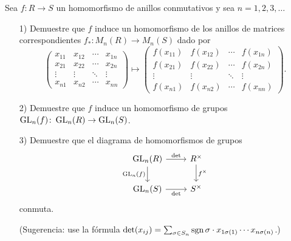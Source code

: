 \begin{ejercicio}
  Sea $f\colon R\to S$ un homomorfismo de anillos conmutativos y sea
  $n = 1,2,3,\ldots$

  \begin{enumerate}
  \item[1)] Demuestre que $f$ induce un homomorfismo de los anillos de matrices
    correspondientes $f_*\colon M_n (R) \to M_n (S)$ dado por
    \[ \begin{pmatrix}
        x_{11} & x_{12} & \cdots & x_{1n} \\
        x_{21} & x_{22} & \cdots & x_{2n} \\
        \vdots & \vdots & \ddots & \vdots \\
        x_{n1} & x_{n2} & \cdots & x_{nn}
      \end{pmatrix}
      \mapsto
      \begin{pmatrix}
        f (x_{11}) & f (x_{12}) & \cdots & f (x_{1n}) \\
        f (x_{21}) & f (x_{22}) & \cdots & f (x_{2n}) \\
        \vdots & \vdots & \ddots & \vdots \\
        f (x_{n1}) & f (x_{n2}) & \cdots & f (x_{nn})
      \end{pmatrix}. \]

  \item[2)] Demuestre que $f$ induce un homomorfismo de grupos
    $\operatorname{GL}_n (f)\colon \operatorname{GL}_n (R) \to \operatorname{GL}_n (S)$.

  \item[3)] Demuestre que el diagrama de homomorfismos de grupos
    \[ \begin{tikzcd}
        \GL_n (R) \ar{r}{\det}\ar{d}[swap]{\GL_n (f)} &
        R^\times\ar{d}{f^\times} \\
        \GL_n (S) \ar{r}[swap]{\det} & S^\times
      \end{tikzcd} \]
    conmuta.

    (Sugerencia: use la fórmula
    $\det (x_{ij}) = \sum_{\sigma\in S_n}\operatorname{sgn}\sigma\cdot x_{1\sigma (1)}\cdots x_{n\sigma (n)}$.)
  \end{enumerate}


\end{ejercicio}
